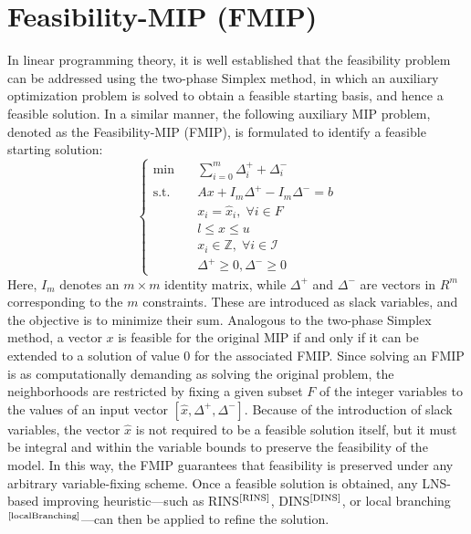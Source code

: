 \section{Feasibility-MIP (FMIP)}
In linear programming theory, it is well established that the feasibility problem can be addressed using the two-phase Simplex method, in which an auxiliary optimization problem is solved to obtain a feasible starting basis, and hence a feasible solution.
In a similar manner, the following auxiliary MIP problem, denoted as the Feasibility-MIP (FMIP), is formulated to identify a feasible starting solution:
\begin{equation}
\begin{cases}
\text{min} \quad & \sum_{i=0}^m \Delta_i^{+}+\Delta_i^{-} \\ \text{s.t.} \quad & Ax + I_m\Delta^+ - I_m\Delta^- =b\\ & x_i = \hat{x}_i, \; \forall i \in F\\ & l \le x \le u\\ & x_i \in \mathbb{Z}, \; \forall i \in \mathcal{I} \\ & \Delta^+ \ge 0, \Delta^- \ge 0 
\end{cases}
\end{equation}
Here, $I_m$ denotes an $m \times m$ identity matrix, while $\Delta^+$ and $\Delta^-$ are vectors in $R^m$ corresponding to the $m$ constraints. These are introduced as slack variables, and the objective is to minimize their sum. 
Analogous to the two-phase Simplex method, a vector $x$ is feasible for the original MIP if and only if it can be extended to a solution of value $0$ for the associated FMIP. Since solving an FMIP is as computationally demanding as solving the original problem, the neighborhoods are restricted by fixing a given subset $F$ of the integer variables to the values of an input vector $[\hat{x}, \Delta^+, \Delta^-]$. Because of the introduction of slack variables, the vector $\hat{x}$ is not required to be a feasible solution itself, but it must be integral and within the variable bounds to preserve the feasibility of the model. In this way, the FMIP guarantees that feasibility is preserved under any arbitrary variable-fixing scheme. Once a feasible solution is obtained, any LNS-based improving heuristic—such as RINS$^\text{\cite{RINS}}$, DINS$^\text{\cite{DINS}}$, or local branching$^\text{\cite{localBranching}}$—can then be applied to refine the solution.
